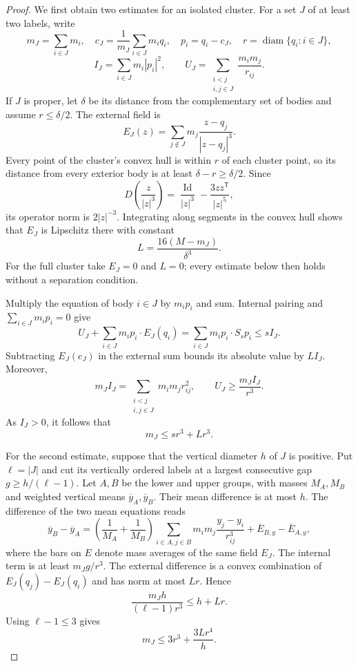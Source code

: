 \documentclass[11pt,a4paper]{amsart}
\numberwithin{equation}{section}
\DeclareMathOperator{\diam}{diam}
\DeclareMathOperator{\Id}{Id}
\begin{document}
\begin{proof}
We first obtain two estimates for an isolated cluster. For a set $J$
of at least two labels, write
\[
 m_J=\sum_{i\in J}m_i,\quad
 c_J=\frac1{m_J}\sum_{i\in J}m_iq_i,\quad p_i=q_i-c_J,\quad
 r=\diam\{q_i:i\in J\},
\]
\[
 I_J=\sum_{i\in J}m_i|p_i|^2,\qquad
 U_J=\sum_{\substack{i<j\\i,j\in J}}\frac{m_im_j}{r_{ij}}.
\]
If $J$ is proper, let $\delta$ be its distance from the complementary
set of bodies and assume $r\le\delta/2$. The external field is
\[
 E_J(z)=\sum_{j\notin J}m_j\frac{z-q_j}{|z-q_j|^3}.
\]
Every point of the cluster's convex hull is within $r$ of each cluster
point, so its distance from every exterior body is at least
$\delta-r\ge\delta/2$.
Since
\begin{equation}\label{eq:force-derivative}
 D\left(\frac z{|z|^3}\right)
     =\frac{\Id}{|z|^3}-\frac{3zz^{\mathsf T}}{|z|^5},
\end{equation}
its operator norm is $2|z|^{-3}$. Integrating along segments in the
convex hull shows that $E_J$ is Lipschitz there with constant
\begin{equation}\label{eq:external-lipschitz}
 L=\frac{16(M-m_J)}{\delta^3}.
\end{equation}
For the full cluster take $E_J=0$ and $L=0$; every estimate below
then holds without a separation condition.

Multiply the equation of body $i\in J$ by $m_ip_i$ and sum. Internal
pairing and $\sum_{i\in J}m_ip_i=0$ give
\[
 U_J+\sum_{i\in J}m_ip_i\cdot E_J(q_i)
       =\sum_{i\in J}m_ip_i\cdot S_s p_i\le sI_J.
\]
Subtracting $E_J(c_J)$ in the external sum bounds its absolute value
by $LI_J$. Moreover,
\[
 m_JI_J=\sum_{\substack{i<j\\i,j\in J}}m_im_jr_{ij}^2,
 \qquad U_J\ge\frac{m_JI_J}{r^3}.
\]
As $I_J>0$, it follows that
\begin{equation}\label{eq:cluster-virial-bound}
 m_J\le sr^3+Lr^3.
\end{equation}

For the second estimate, suppose that the vertical diameter $h$ of
$J$ is positive. Put $\ell=|J|$ and cut its vertically ordered labels
at a largest consecutive gap $g\ge h/(\ell-1)$. Let $A,B$ be the lower
and upper groups, with masses $M_A,M_B$ and weighted vertical means
$\overline y_A,\overline y_B$. Their mean difference is at most $h$.
The difference of the two mean equations reads
\[
 \overline y_B-\overline y_A
 =\left(\frac1{M_A}+\frac1{M_B}\right)
  \sum_{i\in A,j\in B}m_im_j\frac{y_j-y_i}{r_{ij}^3}
    +\overline E_{B,y}-\overline E_{A,y},
\]
where the bars on $E$ denote mass averages of the same field $E_J$.
The internal term is at least $m_Jg/r^3$. The external difference
is a convex combination of $E_J(q_j)-E_J(q_i)$ and has norm at most
$Lr$. Hence
\[
 \frac{m_Jh}{(\ell-1)r^3}\le h+Lr.
\]
Using $\ell-1\le3$ gives
\begin{equation}\label{eq:vertical-cluster-bound}
 m_J\le3r^3+\frac{3Lr^4}{h}.
\end{equation}


\end{proof}
\end{document}
